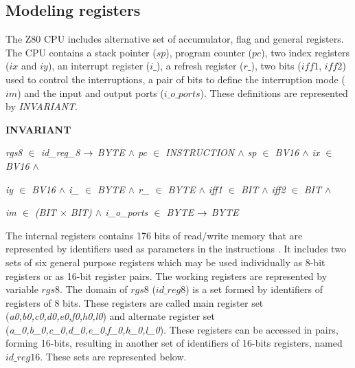 \documentclass[a4paper]{llncs}
\begin{document}
\subsection{Modeling registers}

The Z80 CPU includes alternative set of accumulator, flag and general registers. The CPU contains a stack
pointer ($\textit{sp}$), program counter ($\textit{pc}$), two index registers ($\textit{ix}$ and $\textit{iy}$), an
interrupt register ($\textit{i\_}$), a refresh register ($\textit{r\_}$), two bits ($\textit{iff1}$,
$\textit{iff2}$) used to control the interruptions, a pair of bits to define the interruption mode ($\textit{im}$)
and the input and output ports ($\textit{i\_o\_ports}$). These definitions are represented by
\textit{INVARIANT}.
  

\begin{sloppypar}
\bf INVARIANT

\hspace*{0.10in}\it rgs8  $\in$  \it id\_reg\_8  $\rightarrow$  \it BYTE  $\land$ \it pc  $\in$  \it INSTRUCTION  $\land$  \it sp  $\in$  \it BV16 $\land$  \it ix  $\in$  \it BV16  $\land$

\hspace*{0.10in}\it iy  $\in$  \it BV16  $\land$ \it i\_  $\in$  \it BYTE  $\land$  \it r\_ $\in$  \it BYTE  $\land$ \it iff1  $\in$  \it BIT  $\land$ \it iff2  $\in$  \it BIT  $\land$ 

\hspace*{0.10in}\it im $\in$ (\it BIT $\times$ \it BIT\rm )  $\land$  \it i\_o\_ports  $\in$  \it BYTE  $\rightarrow$  \it BYTE
\end{sloppypar}


 

  The internal registers contains 176 bits of read/write memory that are represented by
identifiers used as parameters in the instructions . It includes two sets of six general purpose
registers which may be used individually as 8-bit registers or as 16-bit register pairs.  The working
registers are represented by variable $\textit{rgs8}$. The domain of $\textit{rgs8}$
($\textit{id\_reg8}$) is a set formed by identifiers of registers of 8 bits. These registers are called
main register set (\textit{a0,b0,c0,d0,e0,f0,h0,l0}) and alternate register set
(\textit{a\_0,b\_0,c\_0,d\_0,e\_0,f\_0,h\_0,l\_0}). These registers can be accessed in pairs, forming
16-bits, resulting in another set of identifiers of 16-bits registers, named $\textit{id\_reg16}$. These sets are represented below.
\end{document}
